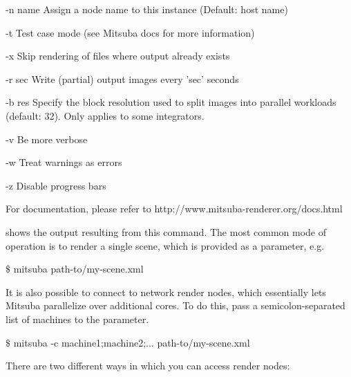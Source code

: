 \begin{console}[label=lst:mitsuba-cli,caption=Command line options of the \texttt{mitsuba} binary]
   -n name     Assign a node name to this instance (Default: host name)

   -t          Test case mode (see Mitsuba docs for more information)

   -x          Skip rendering of files where output already exists

   -r sec      Write (partial) output images every 'sec' seconds

   -b res      Specify the block resolution used to split images into parallel
               workloads (default: 32). Only applies to some integrators.

   -v          Be more verbose

   -w          Treat warnings as errors

   -z          Disable progress bars

 For documentation, please refer to http://www.mitsuba-renderer.org/docs.html
\end{console}
 shows the output resulting from this command. The most common
mode of operation is to render a single scene, which is provided as a parameter, e.g.
\begin{shell}
$\texttt{\$}$ mitsuba path-to/my-scene.xml
\end{shell}
It is also possible to connect to network render nodes, which essentially lets Mitsuba parallelize
over additional cores. To do this, pass a semicolon-separated list of machines to 
the  parameter. 
\begin{shell}
$\texttt{\$}$ mitsuba -c machine1;machine2;... path-to/my-scene.xml
\end{shell}
There are two different ways in which you can access render nodes:
